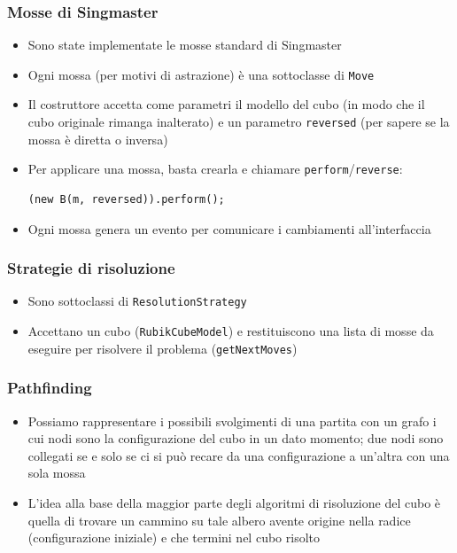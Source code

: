 \documentclass{beamer}
\begin{document}
\begin{frame}[fragile]
\frametitle{Mosse di Singmaster}
\begin{itemize}
\item Sono state implementate le mosse standard di Singmaster
\item Ogni mossa (per motivi di astrazione) è una sottoclasse di \texttt{Move}
\item Il costruttore accetta come parametri il modello del cubo (in modo che il
cubo originale rimanga inalterato) e un parametro \texttt{reversed} (per sapere
se la mossa è diretta o inversa)
\item Per applicare una mossa, basta crearla e chiamare
\texttt{perform}/\texttt{reverse}:
\begin{center}
\begin{lstlisting}
(new B(m, reversed)).perform();
\end{lstlisting}
\end{center}
\item Ogni mossa genera un evento per comunicare i cambiamenti all'interfaccia
\end{itemize}
\end{frame}

\begin{frame}
\frametitle{Strategie di risoluzione}
\begin{itemize}
\item Sono sottoclassi di \texttt{ResolutionStrategy}
\item Accettano un cubo (\texttt{RubikCubeModel}) e restituiscono una lista di
mosse da eseguire per risolvere il problema (\texttt{getNextMoves})
\end{itemize}
\end{frame}

\begin{frame}
\frametitle{Pathfinding}
\begin{itemize}
\item Possiamo rappresentare i possibili svolgimenti di una partita con un
grafo i cui nodi sono la configurazione del cubo in un dato momento; due nodi
sono collegati se e solo se ci si può recare da una configurazione a un'altra
con una sola mossa
\item L'idea alla base della maggior parte degli algoritmi di risoluzione del
cubo è quella di trovare un cammino su tale albero avente origine nella radice
(configurazione iniziale) e che termini nel cubo risolto
\end{itemize}
\end{frame}
\end{document}
